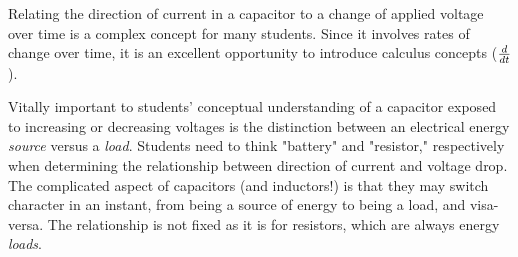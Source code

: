 
Relating the direction of current in a capacitor to a change of applied voltage over time is a complex concept for many students.  Since it involves rates of change over time, it is an excellent opportunity to introduce calculus concepts (${d \over dt}$).

Vitally important to students' conceptual understanding of a capacitor exposed to increasing or decreasing voltages is the distinction between an electrical energy {\it source} versus a {\it load}.  Students need to think "battery" and "resistor," respectively when determining the relationship between direction of current and voltage drop.  The complicated aspect of capacitors (and inductors!) is that they may switch character in an instant, from being a source of energy to being a load, and visa-versa.  The relationship is not fixed as it is for resistors, which are always energy {\it loads}.




